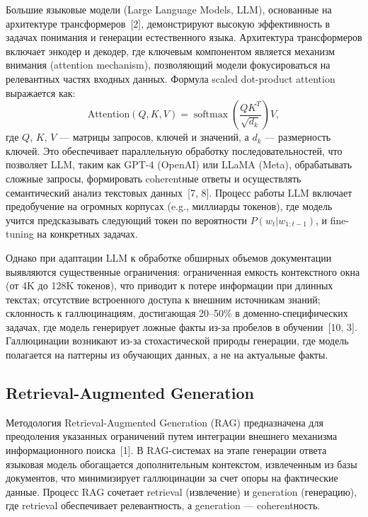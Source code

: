 \documentclass[a4paper,12pt]{article}
\DeclareMathOperator{\softmax}{softmax}
\begin{document}
Большие языковые модели (Large Language Models, LLM), основанные на архитектуре трансформеров~[2], демонстрируют высокую эффективность в задачах понимания и генерации естественного языка. Архитектура трансформеров включает энкодер и декодер, где ключевым компонентом является механизм внимания (attention mechanism), позволяющий модели фокусироваться на релевантных частях входных данных. Формула scaled dot-product attention выражается как:
\[
\text{Attention}(Q, K, V) = \softmax\left(\frac{QK^T}{\sqrt{d_k}}\right)V,
\]
где $Q$, $K$, $V$ --- матрицы запросов, ключей и значений, а $d_k$ --- размерность ключей. Это обеспечивает параллельную обработку последовательностей, что позволяет LLM, таким как GPT-4 (OpenAI) или LLaMA (Meta), обрабатывать сложные запросы, формировать coherentные ответы и осуществлять семантический анализ текстовых данных~[7, 8]. Процесс работы LLM включает предобучение на огромных корпусах (e.g., миллиарды токенов), где модель учится предсказывать следующий токен по вероятности $P(w_t | w_{1:t-1})$, и fine-tuning на конкретных задачах.

Однако при адаптации LLM к обработке обширных объемов документации выявляются существенные ограничения: ограниченная емкость контекстного окна (от 4K до 128K токенов), что приводит к потере информации при длинных текстах; отсутствие встроенного доступа к внешним источникам знаний; склонность к галлюцинациям, достигающая 20--50\% в доменно-специфических задачах, где модель генерирует ложные факты из-за пробелов в обучении~[10, 3]. Галлюцинации возникают из-за стохастической природы генерации, где модель полагается на паттерны из обучающих данных, а не на актуальные факты.

\subsection{Retrieval-Augmented Generation}

Методология Retrieval-Augmented Generation (RAG) предназначена для преодоления указанных ограничений путем интеграции внешнего механизма информационного поиска~[1]. В RAG-системах на этапе генерации ответа языковая модель обогащается дополнительным контекстом, извлеченным из базы документов, что минимизирует галлюцинации за счет опоры на фактические данные. Процесс RAG сочетает retrieval (извлечение) и generation (генерацию), где retrieval обеспечивает релевантность, а generation --- coherentность.
\end{document}
